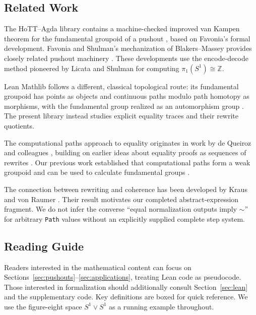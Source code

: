 \documentclass{lmcs}
\theoremstyle{definition}
\theoremstyle{plain}
\theoremstyle{remark}
\newcommand{\RwEq}{\sim}
\newcommand{\piOne}{\pi_1}
\newcommand{\Wedge}{\vee}
\newcommand{\ZZ}{\mathbb{Z}}
\newcommand{\Sone}{S^1}
\begin{document}
\subsection{Related Work}

The HoTT--Agda library contains a machine-checked improved van Kampen theorem
for the fundamental groupoid of a pushout \cite{HoTTAgda}, based on Favonia's
formal development.  Favonia and Shulman's mechanization of Blakers--Massey
provides closely related pushout machinery \cite{FavoniaShulman2016}.  These
developments use the encode-decode method pioneered by Licata and Shulman
\cite{LicataShulman2013} for computing $\piOne(\Sone) \cong \ZZ$.

Lean Mathlib follows a different, classical topological route: its fundamental
groupoid has points as objects and continuous paths modulo path homotopy as
morphisms, with the fundamental group realized as an automorphism group
\cite{MathlibFundamentalGroupoid}.  The present library instead studies explicit
equality traces and their rewrite quotients.

The computational paths approach to equality originates in work by de Queiroz and colleagues \cite{Queiroz2016Paths, Ramos2017IdentityPaths, Ramos2018ExplicitPaths}, building on earlier ideas about equality proofs as sequences of rewrites \cite{Ruy4}. Our previous work established that computational paths form a weak groupoid \cite{Veras2023WeakGroupoid} and can be used to calculate fundamental groups \cite{Veras2018FundamentalGroups, Veras2023Topological}.

The connection between rewriting and coherence has been developed by Kraus and
von Raumer \cite{KrausVonRaumer2022}.  Their result motivates our completed
abstract-expression fragment.  We do not infer the converse
``equal normalization outputs imply $\RwEq$'' for arbitrary \texttt{Path}
values without an explicitly supplied complete step system.

\subsection{Reading Guide}

Readers interested in the mathematical content can focus on Sections~\ref{sec:pushouts}--\ref{sec:applications}, treating Lean code as pseudocode. Those interested in formalization should additionally consult Section~\ref{sec:lean} and the supplementary code. Key definitions are boxed for quick reference. We use the figure-eight space $\Sone \Wedge \Sone$ as a running example throughout.
\end{document}
